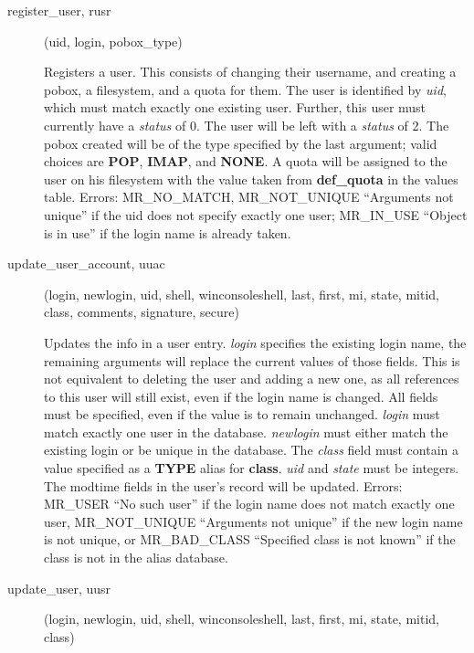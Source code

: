 \documentclass{article}
\begin{document}
\begin{description}
\item[register\_user, rusr](uid, login, pobox\_type)

Registers a user. This consists of changing their username, and creating
a pobox, a filesystem, and a quota for them.  The user is identified by
{\em uid}, which must match exactly one existing user. Further, this
user must currently have a {\em status} of 0. The user will be left with
a {\em status} of 2. The pobox created will be of the type specified by
the last argument; valid choices are {\bf POP}, {\bf IMAP}, and {\bf
NONE}. A quota will be assigned to the user on his filesystem with the
value taken from {\bf def\_quota} in the values table. Errors:
MR\_NO\_MATCH, MR\_NOT\_UNIQUE ``Arguments not unique'' if the uid does
not specify exactly one user; MR\_IN\_USE ``Object is in use'' if the
login name is already taken.

\item[update\_user\_account, uuac](login, newlogin, uid, shell,
winconsoleshell, last,
first, mi, state, mitid, class, comments, signature, secure)

Updates the info in a user entry.  {\em login} specifies the existing
login name, the remaining arguments will replace the current values
of those fields.  This is not equivalent to deleting the user and
adding a new one, as all references to this user will still exist,
even if the login name is changed.  All fields must be specified, even
if the value is to remain unchanged.  {\em login} must match exactly one
user in the database.  {\em newlogin} must either match the existing
login or be unique in the database.  The {\em class} field must contain
a value specified as a {\bf TYPE} alias for {\bf class}.  {\em uid} and
{\em state} must be integers.  The modtime fields in the user's record
will be updated.  Errors: MR\_USER ``No such user'' if the login name
does not match exactly one user, MR\_NOT\_UNIQUE ``Arguments not unique''
if the new login name is not unique, or MR\_BAD\_CLASS ``Specified class
is not known'' if the class is not in the alias database.

\item[update\_user, uusr](login, newlogin, uid, shell, winconsoleshell, last, first, mi, state,
mitid, class)


\end{description}
\end{document}
